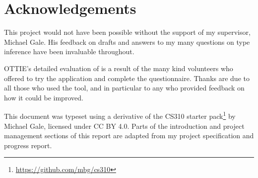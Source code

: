 \documentclass[a4paper,fleqn,oneside,12pt]{report}
\begin{document}
\chapter*{Acknowledgements}\label{id:h.xqaef57orpsv}

This project would not have been possible without the support of my supervisor, Michael Gale. His feedback on drafts and answers to my many questions on type inference have been invaluable throughout.

OTTIE's detailed evaluation of is a result of the many kind volunteers who offered to try the application and complete the questionnaire. Thanks are due to all those who used the tool, and in particular to any who provided feedback on how it could be improved.

This document was typeset using a derivative of the CS310 starter pack\footnote{\href{https://github.com/mbg/cs310}{https://github.com/mbg/cs310}} by Michael Gale, licensed under CC BY 4.0. Parts of the introduction and project management sections of this report are adapted from my project specification and progress report.

\newpage
{}
{}


\end{document}
